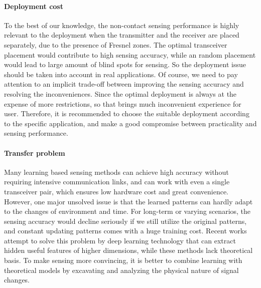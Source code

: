 \paragraph*{Deployment cost} To the best of our knowledge, the non-contact sensing performance is highly relevant to the deployment when
the transmitter and the receiver are placed separately, due to the presence of Fresnel zones\FIXME{\cite{}}. The optimal transceiver
placement would contribute to high sensing accuracy, while an random placement would lead to large amount of blind spots for sensing. So
the deployment issue should be taken into account in real applications. Of course, we need to pay attention to an implicit trade-off
between improving the sensing accuracy and resolving the inconveniences. Since the optimal deployment is always at the expense of more
restrictions, so that brings much inconvenient experience for user. Therefore, it is recommended to choose the suitable deployment
according to the specific application, and make a good compromise between practicality and sensing performance.

\paragraph*{Transfer problem} Many learning based sensing methods can achieve high accuracy without requiring intensive communication
links, and can work with even a single transceiver pair, which ensures low hardware cost and great convenience. However, one major unsolved
issue is that the learned patterns can hardly adapt to the changes of environment and time. For long-term or varying scenarios, the sensing
accuracy would decline seriously if we still utilize the original patterns, and constant updating patterns comes with a huge training cost.
Recent works attempt to solve this problem by deep learning technology that can extract hidden useful features of higher dimensions, while
these methods lack theoretical basis. To make sensing more convincing, it is better to combine learning with theoretical models by
excavating and analyzing the physical nature of signal changes.


